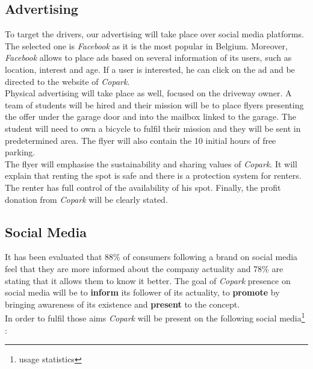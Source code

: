 \documentclass[12pt,a4paper,oneside]{book}
\newcommand{\bp}{\textit{Copark}}
\begin{document}
\subsection{Advertising}
To target the drivers, our advertising will take place over social media platforms. The selected one is \textit{Facebook} as it is the most popular in Belgium.\cite{smstat} Moreover, \textit{Facebook} allows to place ads based on several information of its users, such as location, interest and age. If a user is interested, he can click on the ad and be directed to the website of \bp{}.\\

Physical advertising will take place as well, focused on the driveway owner. A team of students will be hired and their mission will be to place flyers presenting the offer under the garage door and into the mailbox linked to the garage. The student will need to own a bicycle to fulfil their mission and they will be sent in predetermined area. The flyer will also contain the 10 initial hours of free parking.\\

The flyer will emphasise the sustainability and sharing values of \bp{}. It will explain that renting the spot is safe and there is a protection system for renters. The renter has full control of the availability of his spot. Finally, the profit donation from \bp{} will be clearly stated.

\subsection{Social Media}
It has been evaluated that 88\% of consumers following a brand on social media feel that they are more informed about the company actuality and  78\% are stating that it allows them to know it better.\cite{sminfo} The goal of \bp{} presence on social media will be to \textbf{inform} its follower of its actuality, to \textbf{promote} by bringing awareness of its existence and \textbf{present} to the concept.\\

In order to fulfil those aims \bp{} will be present on the following social media\footnote{usage statistics\cite{smusage}} :
\end{document}
